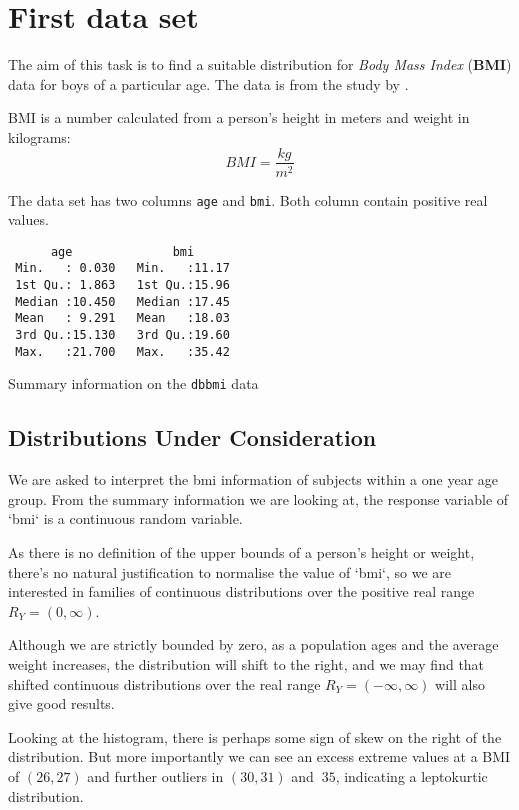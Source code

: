 \section{First data set}

The aim of this task is to find a suitable distribution for \emph{Body Mass Index} (\textbf{BMI}) data for boys of
a particular age.  The data is from the study  by \citeauthor{Fredriks:2000}
\citeyear{Fredriks:2000} \cite{Fredriks:2000}.

BMI is a number calculated from a person's height in meters and weight in kilograms:
\begin{equation}
  BMI = \frac{kg}{m^2}
\end{equation}

The data set has two columns \verb|age| and \verb|bmi|.  Both column contain positive real values.

\begin{table}[!ht]
\begin{verbatim}
      age              bmi       
 Min.   : 0.030   Min.   :11.17  
 1st Qu.: 1.863   1st Qu.:15.96  
 Median :10.450   Median :17.45  
 Mean   : 9.291   Mean   :18.03  
 3rd Qu.:15.130   3rd Qu.:19.60  
 Max.   :21.700   Max.   :35.42  
\end{verbatim}
\caption {Summary information on the \texttt{dbbmi} data}
\end{table}


\subsection{Distributions Under Consideration}

We are asked to interpret the bmi information of subjects within a one year
age group.  From the summary information we are looking at, the response
variable of `bmi` is a continuous random variable.

As there is no definition of the upper bounds of a person's height or weight,
there's no natural justification to normalise the value of `bmi`, so we are
interested in families of continuous distributions over the positive real
range $R_Y = (0, \infty)$.

Although we are strictly bounded by zero, as a population ages and the average
weight increases, the distribution will shift to the right, and we may find that
shifted continuous distributions over the real range $R_Y =  (-\infty, \infty)$ will
also give good results.

Looking at the histogram, there is perhaps some sign of skew on the right of the distribution.
But more importantly we can see an excess extreme values at a BMI of $(26, 27)$ and
further outliers in $(30, 31)$ and $~35$, indicating a leptokurtic distribution.

